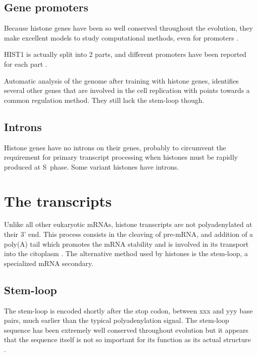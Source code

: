 \documentclass[10pt,a4paper,twocolumn,article]{memoir}
\begin{document}
    \subsection{Gene promoters}

      Because histone genes have been so well conserved throughout the evolution, they make
      excellent models to study computational methods, even for promoters
      \citep{histone-promoter-modeling}.

      HIST1 is actually split into 2 parts, and different promoters have been reported for each
      part \citep{HISTOne-different-transcripts}.

      Automatic analysis of the genome after training with histone genes, identifies
      several other genes that are involved in the cell replication with points
      towards a common regulation method. They still lack the stem-loop though.

    \subsection{Introns}
      Histone genes have no introns on their genes, probably to circumvent the
      requirement for primary transcript processing when histones must be rapidly
      produced at S~phase. Some variant histones have introns.

  \section{The transcripts}
    Unlike all other eukaryotic mRNAs, histone transcripts are not polyadenylated at
    their 3' end. This process consists in the cleaving of pre-mRNA, and addition of a
    poly(A) tail which promotes the mRNA stability and is involved in its transport
    into the citoplasm \citep{mRNA-end-processing}. The alternative method used by
    histones is the stem-loop, a specialized mRNA secondary.

    \subsection{Stem-loop}
      The stem-loop is encoded shortly after the stop codon, between xxx and yyy base
      pairs, much earlier than the typical polyadenylation signal. The stem-loop sequence
      has been extremely well conserved throughout evolution but it appears that the
      sequence itself is not so important for its function as its actual structure
      \citep{stem-loop-structure}.
\end{document}
